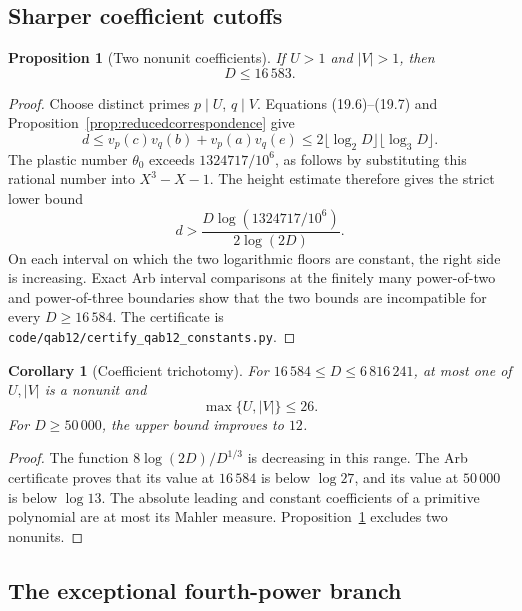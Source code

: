 \documentclass[11pt]{article}
\newtheorem{proposition}[theorem]{Proposition}
\newtheorem{corollary}[theorem]{Corollary}
\theoremstyle{definition}
\begin{document}
\subsection{Sharper coefficient cutoffs}

\begin{proposition}[Two nonunit coefficients]\label{prop:twononunit}
If \(U>1\) and \(|V|>1\), then
\begin{equation}
 \boxed{D\leq16\,583.}
 \tag{19.9}
\end{equation}
\end{proposition}

\begin{proof}
Choose distinct primes \(p\mid U\), \(q\mid V\).  Equations
(19.6)--(19.7) and Proposition~\ref{prop:reducedcorrespondence} give
\[
 d\leq v_p(c)v_q(b)+v_p(a)v_q(e)
 \leq2\lfloor\log_2D\rfloor\lfloor\log_3D\rfloor.
\]
The plastic number \(\theta_0\) exceeds
\(1324717/10^6\), as follows by substituting this rational number into
\(X^3-X-1\).  The height estimate therefore gives the strict lower bound
\[
 d>
 \frac{D\log(1324717/10^6)}{2\log(2D)}.
\]
On each interval on which the two logarithmic floors are constant, the right
side is increasing.  Exact Arb interval comparisons at the finitely many
power-of-two and power-of-three boundaries show that the two bounds are
incompatible for every \(D\geq16\,584\).  The certificate is
\texttt{code/qab12/certify\_qab12\_constants.py}.
\end{proof}

\begin{corollary}[Coefficient trichotomy]\label{cor:coefftrichotomy}
For \(16\,584\leq D\leq6\,816\,241\), at most one of \(U,|V|\) is a
nonunit and
\[
 \max\{U,|V|\}\leq26.
\]
For \(D\geq50\,000\), the upper bound improves to \(12\).
\end{corollary}

\begin{proof}
The function \(8\log(2D)/D^{1/3}\) is decreasing in this range.  The Arb
certificate proves that its value at \(16\,584\) is below \(\log27\), and
its value at \(50\,000\) is below \(\log13\).  The absolute leading and
constant coefficients of a primitive polynomial are at most its Mahler
measure.  Proposition~\ref{prop:twononunit} excludes two nonunits.
\end{proof}

\subsection{The exceptional fourth-power branch}
\end{document}
